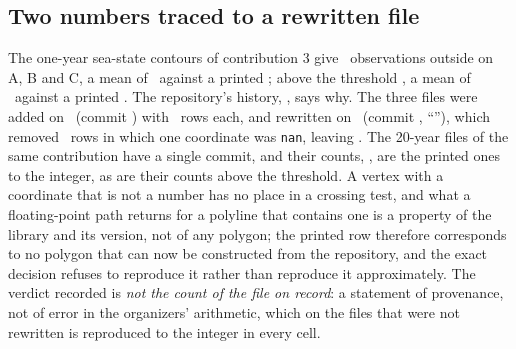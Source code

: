 \documentclass[preprint,11pt,authoryear]{elsarticle}
\begin{document}
\begin{table}[p]
\centering\scriptsize
\caption{Wind--wave datasets D, E, F, the 50-year contours on the full \EHoursDEF\ hours, as Table~\ref{tab:abc}; the threshold is $u_{10} > 1$ m/s and $\Hs > 1$ m.}
\label{tab:def}
\end{table}

\subsection{Two numbers traced to a rewritten file}\label{sec:rewritten}
The one-year sea-state contours of contribution 3 give \EThreeOutEach\ observations outside on A, B and C, a mean of \EThreeOutMean\ against a printed \EThreePrintedOut; above the threshold \EThreeAboveEach, a mean of \EThreeAboveMean\ against a printed \EThreePrintedAbove. The repository's history, \ELinRead, says why. The three files were added on \ELinAddedDate\ (commit \texttt{\ELinAddedCommit}) with \ELinAddedRows\ rows each, and rewritten on \ELinRewrittenDate\ (commit \texttt{\ELinRewrittenCommit}, ``\ELinMessage''), which removed \ELinRemoved\ rows in which one coordinate was \texttt{nan}, leaving \ELinAfter. The 20-year files of the same contribution have a single commit, and their counts, \EThreeLongEach, are the printed ones to the integer, as are their counts above the threshold. A vertex with a coordinate that is not a number has no place in a crossing test, and what a floating-point path returns for a polyline that contains one is a property of the library and its version, not of any polygon; the printed row therefore corresponds to no polygon that can now be constructed from the repository, and the exact decision refuses to reproduce it rather than reproduce it approximately. The verdict recorded is \emph{not the count of the file on record}: a statement of provenance, not of error in the organizers' arithmetic, which on the files that were not rewritten is reproduced to the integer in every cell.
\end{document}
